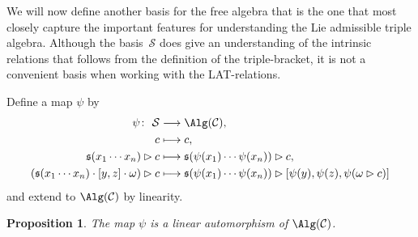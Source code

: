 \documentclass[pdftex]{sigma}
\numberwithin{equation}{section}
\newtheorem{Proposition}[Theorem]{Proposition}
 { \theoremstyle{definition}
\newtheorem{Definition}[Theorem]{Definition}
\newtheorem{Note}[Theorem]{Note}
\newtheorem{Example}[Theorem]{Example}
\newtheorem{Remark}[Theorem]{Remark} }
\begin{document}
We will now define another basis for the free algebra that is the one that most closely capture the important features for understanding the Lie admissible triple algebra. Although the basis~$\mathcal{S}$ does give an understanding of the intrinsic relations that follows from the definition of the triple-bracket, it is not a convenient basis when working with the LAT-relations.

\begin{Definition}
 Define a map $\psi$ by
 \begin{align*}
 \psi\colon \ \mathcal{S} &\longrightarrow \Alg(\mathcal{C}), \\
 c &\longmapsto c ,\\
 \mathfrak{s}(x_1 \cdots x_n) \rhd c &\longmapsto \mathfrak{s}(\psi(x_1) \cdots \psi(x_n)) \rhd c, \\
 (\mathfrak{s}(x_1 \cdots x_n) \cdot [y, z] \cdot \omega) \rhd c & \longmapsto \mathfrak{s}(\psi(x_1) \cdots \psi(x_n)) \rhd [\psi(y), \psi(z), \psi(\omega \rhd c)]
 \end{align*}
 and extend to $\Alg(\mathcal{C})$ by linearity.
\end{Definition}

\begin{Proposition}
 The map $\psi$ is a linear automorphism of $\Alg(\mathcal{C})$.%
\end{Proposition}
\end{document}
